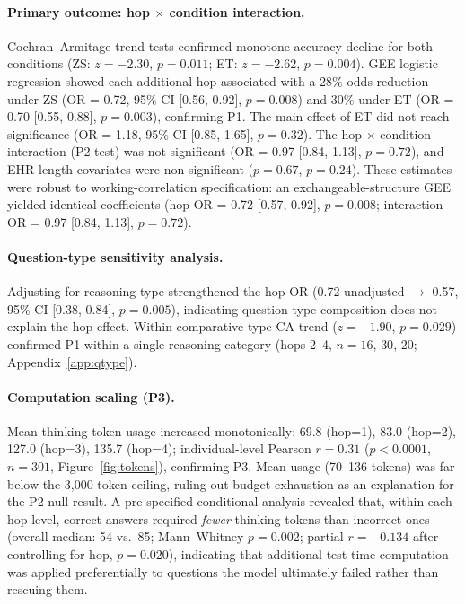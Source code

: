 \documentclass{article}
\begin{document}
\paragraph{Primary outcome: hop $\times$ condition interaction.}
Cochran--Armitage trend tests confirmed monotone accuracy decline for both conditions (ZS: $z = -2.30$, $p = 0.011$; ET: $z = -2.62$, $p = 0.004$). GEE logistic regression showed each additional hop associated with a 28\% odds reduction under ZS (OR = 0.72, 95\% CI [0.56, 0.92], $p = 0.008$) and 30\% under ET (OR = 0.70 [0.55, 0.88], $p = 0.003$), confirming P1. The main effect of ET did not reach significance (OR = 1.18, 95\% CI [0.85, 1.65], $p = 0.32$). The hop $\times$ condition interaction (P2 test) was not significant (OR = 0.97 [0.84, 1.13], $p = 0.72$), and EHR length covariates were non-significant ($p = 0.67$, $p = 0.24$). These estimates were robust to working-correlation specification: an exchangeable-structure GEE yielded identical coefficients (hop OR = 0.72 [0.57, 0.92], $p = 0.008$; interaction OR = 0.97 [0.84, 1.13], $p = 0.72$).

\paragraph{Question-type sensitivity analysis.}
Adjusting for reasoning type strengthened the hop OR (0.72 unadjusted $\to$ 0.57, 95\% CI [0.38, 0.84], $p = 0.005$), indicating question-type composition does not explain the hop effect. Within-comparative-type CA trend ($z = -1.90$, $p = 0.029$) confirmed P1 within a single reasoning category (hops 2--4, $n = 16$, $30$, $20$; Appendix~\ref{app:qtype}).

\paragraph{Computation scaling (P3).}
Mean thinking-token usage increased monotonically: 69.8 (hop=1), 83.0 (hop=2), 127.0 (hop=3), 135.7 (hop=4); individual-level Pearson $r = 0.31$ ($p < 0.0001$, $n = 301$, Figure~\ref{fig:tokens}), confirming P3. Mean usage (70--136 tokens) was far below the 3,000-token ceiling, ruling out budget exhaustion as an explanation for the P2 null result. A pre-specified conditional analysis revealed that, within each hop level, correct answers required \emph{fewer} thinking tokens than incorrect ones (overall median: 54 vs.\ 85; Mann--Whitney $p = 0.002$; partial $r = -0.134$ after controlling for hop, $p = 0.020$), indicating that additional test-time computation was applied preferentially to questions the model ultimately failed rather than rescuing them.
\end{document}
